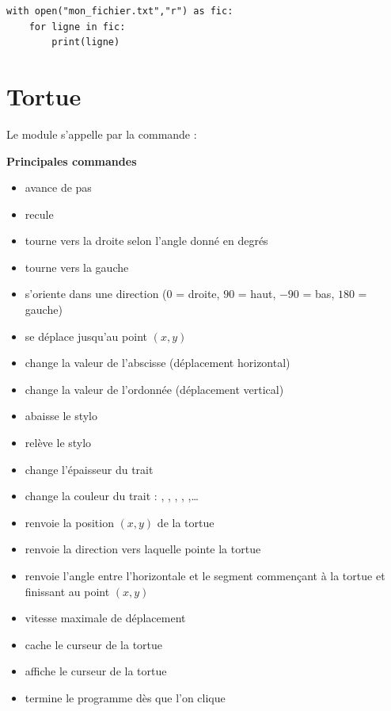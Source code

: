 \documentclass[11pt,class=report,crop=false]{standalone}
\begin{document}
\begin{lstlisting}
with open("mon_fichier.txt","r") as fic: 
    for ligne in fic: 
        print(ligne) 
\end{lstlisting}


\section{Tortue}

Le module  s'appelle par la commande :

\bigskip

\textbf{Principales commandes}
\begin{itemize}
  \item {} \quad avance de  pas
  \item {} \quad recule
  \item {} \quad tourne vers la droite selon l'angle donné en degrés
  \item {} \quad tourne vers la gauche
  \item {} \quad s'oriente dans une direction ($0$ = droite, $90$ = haut, $-90$ = bas, $180$ = gauche)
  \item {} \quad se déplace jusqu'au point $(x,y)$
  \item {} \quad change la valeur de l'abscisse (déplacement horizontal)
  \item {} \quad change la valeur de l'ordonnée (déplacement vertical)
  
  
  \item {} \quad abaisse le stylo
  \item {} \quad relève le stylo
  \item {} \quad change l'épaisseur du trait
  \item {} \quad change la couleur du trait : , , , , ,\ldots
  
  \item {}  \quad renvoie la position $(x,y)$ de la tortue
  \item {} \quad renvoie la direction  vers laquelle pointe la tortue
  \item {} \quad renvoie l'angle entre l'horizontale et le segment commençant à la tortue et finissant au point $(x,y)$
  \item {} \quad vitesse maximale de déplacement
  \item {} \quad cache le curseur de la tortue
  \item {} \quad affiche le curseur de la tortue  
  \item {} \quad termine le programme dès que l'on clique
\end{itemize}
\end{document}
